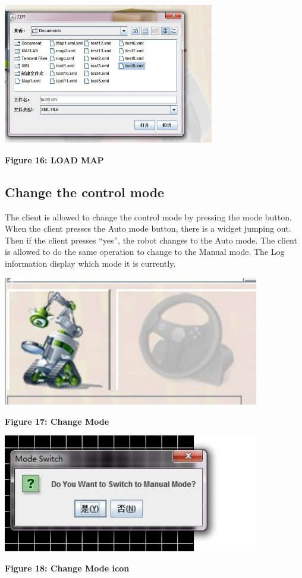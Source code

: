 \documentclass[11pt, a4paper]{report}
\begin{document}
\begin{center}
 \includegraphics[width=9.20cm]{LoadMap.jpg}
\end{center}
\begin{center}
\textbf {Figure 16: LOAD MAP} \\[0.3cm]
\end{center}
\subsection{Change the control mode}
The client is allowed to change the control mode by pressing the mode button. When the client presses the Auto mode button, there is a widget jumping out. Then if the client presses ``yes'', the robot changes to the Auto mode. The client is allowed to do the same operation to change to the Manual mode.  The Log information display which mode it is currently.
\begin{center}
 \includegraphics[width=11.20cm]{ControlModeAuto.jpg}
\end{center}
\begin{center}
\textbf {Figure 17: Change Mode} \\[0.3cm]
\end{center}
\begin{center}
 \includegraphics[width=11.20cm]{ModeSwitch.jpg}
\end{center}
\begin{center}
\textbf {Figure 18: Change Mode icon} \\[0.3cm]
\end{center}
\end{document}
